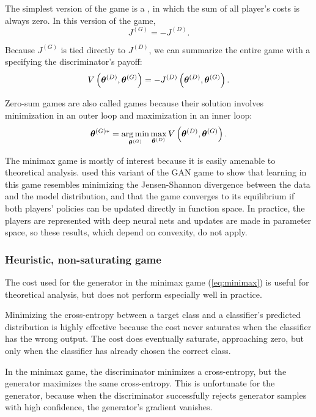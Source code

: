 The simplest version of the game is a , in which the sum of all player's
costs is always zero.
In this version of the game,
\begin{equation}
J^{(G)} = - J^{(D)}.
\label{eq:minimax}
\end{equation}

Because $J^{(G)}$ is tied directly to $J^{(D)}$, we can summarize the entire game with a
 specifying the discriminator's payoff:
\[ V\left({\bm{\theta}}^{(D)}, {\bm{\theta}}^{(G)} \right) = - J^{(D)} \left({\bm{\theta}}^{(D)}, {\bm{\theta}}^{(G)} \right).\]

Zero-sum games are also called  games because their solution involves minimization
in an outer loop and maximization in an inner loop:
\[ {\bm{\theta}}^{(G)*} = \operatorname*{arg\,min}_{{\bm{\theta}}^{(G)}} \max_{{\bm{\theta}}^{(D)}} V\left({\bm{\theta}}^{(D)}, {\bm{\theta}}^{(G)} \right) . \]

The minimax game is mostly of interest because it is easily amenable to theoretical analysis.
\citet{Goodfellow-et-al-NIPS2014-small} used this variant of the GAN game to show that learning in
this game resembles minimizing the Jensen-Shannon divergence between the data and the model distribution,
and that the game converges to its equilibrium if both players' policies can be updated directly in
function space.
In practice, the players are represented with deep neural nets and updates are made in parameter space,
so these results, which depend on convexity, do not apply.

\subsubsection{Heuristic, non-saturating game}
\label{sec:heuristic}

The cost used for the generator in the minimax game (\eqref{eq:minimax}) is useful for theoretical analysis,
but does not perform especially well in practice.

Minimizing the cross-entropy between a target class and a classifier's predicted distribution
is highly effective because the cost never saturates when the classifier has the wrong output.
The cost does eventually saturate, approaching zero, but only when the classifier has already
chosen the correct class.

In the minimax game, the discriminator minimizes a cross-entropy, but the generator maximizes
the same cross-entropy.
This is unfortunate for the generator, because when the discriminator successfully rejects
generator samples with high confidence, the generator's gradient vanishes.

